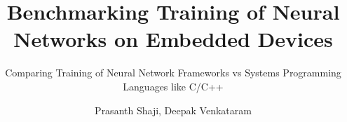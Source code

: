 \documentclass{UUThesisTemplate}
\author{Prasanth Shaji, Deepak Venkataram}
\title{Benchmarking Training of Neural Networks on Embedded Devices}
\subtitle{Comparing Training of Neural Network Frameworks vs Systems Programming Languages like C/C++}
\begin{document}
\frontmatter
	\frontmatterCS



	\begingroup
		\tableofcontents
	\endgroup


\mainmatter
	
	
	

\backmatter
	\nocite{*} %
	
	
\end{document}
